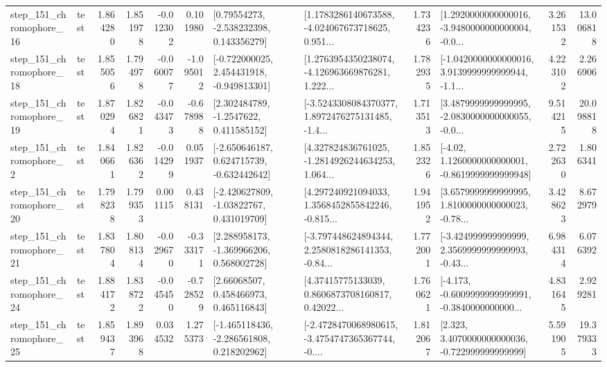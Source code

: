 \begin{tabular}{llrrrrllrlrr}
  step\_151\_chromophore\_16 &      test &      1.864280 &    1.851978 &     -0.012302 &  0.101980 &     [0.79554273, -2.538232398, 0.143356279] &  [1.1783286140673588, -4.024067673718625, 0.951... &       1.734236 &  [1.2920000000000016, -3.9480000000000004, -0.0... &            3.261532 &         13.006818 \\
  step\_151\_chromophore\_18 &      test &      1.855056 &    1.794978 &     -0.060077 & -1.095012 &   [-0.722000025, 2.454431918, -0.949813301] &  [1.2763954350238074, -4.126963669876281, 1.222... &       1.782935 &  [-1.0420000000000016, 3.9139999999999944, -1.1... &            4.223102 &          2.266906 \\
  step\_151\_chromophore\_19 &      test &      1.870294 &    1.826821 &     -0.043473 & -0.678988 &      [2.302484789, -1.2547622, 0.411585152] &  [-3.5243308084370377, 1.8972476275131485, -1.4... &       1.713513 &  [3.4879999999999995, -2.0830000000000055, -0.0... &            9.514215 &         20.098818 \\
   step\_151\_chromophore\_2 &      test &      1.840661 &    1.826362 &     -0.014299 &  0.051937 &   [-2.650646187, 0.624715739, -0.632442642] &  [4.327824836761025, -1.2814926244634253, 1.064... &       1.852326 &   [-4.02, 1.1260000000000001, -0.8619999999999948] &            2.722630 &          1.806341 \\
  step\_151\_chromophore\_20 &      test &      1.798238 &    1.799353 &      0.001115 &  0.438131 &    [-2.420627809, -1.03822767, 0.431019709] &  [4.297240921094033, 1.3568452855842246, -0.815... &       1.941952 &  [3.6579999999999995, 1.8100000000000023, -0.78... &            3.428623 &          8.672979 \\
  step\_151\_chromophore\_21 &      test &      1.837804 &    1.808134 &     -0.029670 & -0.333171 &    [2.288958173, -1.369966206, 0.568002728] &  [-3.797448624894344, 2.2580818286141353, -0.84... &       1.772001 &  [-3.424999999999999, 2.3569999999999993, -0.43... &            6.984314 &          6.076392 \\
  step\_151\_chromophore\_24 &      test &      1.884172 &    1.838722 &     -0.045450 & -0.728529 &      [2.66068507, 0.458466973, 0.465116843] &  [4.37415775133039, 0.8606873708160817, 0.42022... &       1.760621 &  [-4.173, -0.6009999999999991, -0.3840000000000... &            4.831645 &          2.929281 \\
  step\_151\_chromophore\_25 &      test &      1.859437 &    1.893968 &      0.034532 &  1.275373 &   [-1.465118436, -2.286561808, 0.218202962] &  [-2.4728470068980615, -3.4754747365367744, -0.... &       1.812067 &    [2.323, 3.4070000000000036, -0.722999999999999] &            5.591905 &         19.379333 \\

\end{tabular}
